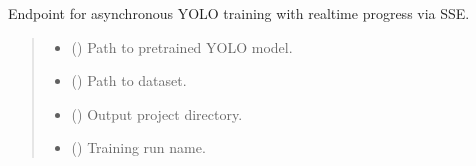 \documentclass[letterpaper,10pt,english]{sphinxmanual}
\begin{document}
\begin{fulllineitems}
\label{\detokenize{modules/src.model_training.trainer:src.model_training.trainer.stream_training}}
\pysigstartsignatures
\pysiglinewithargsret
{}
{\sphinxparamcomma {}\sphinxparamcomma {}\sphinxparamcomma {}\sphinxparamcomma {}}
{}
\pysigstopsignatures
\sphinxAtStartPar
Endpoint for asynchronous YOLO training with real\sphinxhyphen{}time progress via SSE.
\begin{quote}\begin{description}
\begin{itemize}
\item {} 
\sphinxAtStartPar
{} () \textendash{} Path to pretrained YOLO model.

\item {} 
\sphinxAtStartPar
{} () \textendash{} Path to dataset.

\item {} 
\sphinxAtStartPar
{} (\sphinxstyleliteralemphasis{\sphinxupquote{, }}) \textendash{} Output project directory.

\item {} 
\sphinxAtStartPar
{} (\sphinxstyleliteralemphasis{\sphinxupquote{, }}) \textendash{} Training run name.


\end{itemize}
\end{description}
\end{quote}
\end{fulllineitems}
\end{document}
